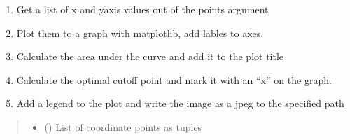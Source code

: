 \documentclass[letterpaper,10pt,english]{sphinxmanual}
\begin{document}
\begin{fulllineitems}
\label{\detokenize{mkloanpy:ronataswestoldturkiccommands.plot_eval.plot_curve}}
\pysigstartsignatures
{}
\pysigstopsignatures\begin{enumerate}
%
\item {} 
\sphinxAtStartPar
Get a list of x\sphinxhyphen{} and y\sphinxhyphen{}axis values out of the points argument

\item {} 
\sphinxAtStartPar
Plot them to a graph with matplotlib, add lables to axes.

\item {} 
\sphinxAtStartPar
Calculate the area under the curve and add it to the plot title

\item {} 
\sphinxAtStartPar
Calculate the optimal cut\sphinxhyphen{}off point and mark it with an “x” on the
graph.

\item {} 
\sphinxAtStartPar
Add a legend to the plot and write the image as a jpeg to the specified
path

\end{enumerate}
\begin{quote}\begin{description}
\begin{itemize}
\item {} 
\sphinxAtStartPar
{} () \textendash{} List of coordinate points as tuples


\end{itemize}
\end{description}
\end{quote}
\end{fulllineitems}
\end{document}
